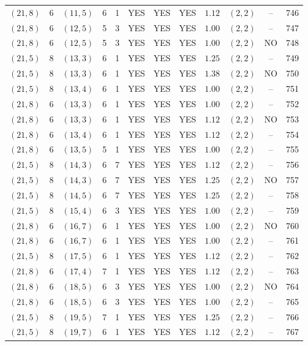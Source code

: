 \begin{longtable}{|c|c|c|c|c|c|c|c|c|c|c|c|}
$(21,8)$ & 6 & $(11,5)$ & 6 & 1 & YES & YES & YES & $1.12$ & $(2,2)$ & -- & 746\\
$(21,8)$ & 6 & $(12,5)$ & 5 & 3 & YES & YES & YES & $1.00$ & $(2,2)$ & -- & 747\\
$(21,8)$ & 6 & $(12,5)$ & 5 & 3 & YES & YES & YES & $1.00$ & $(2,2)$ & NO & 748\\
$(21,5)$ & 8 & $(13,3)$ & 6 & 1 & YES & YES & YES & $1.25$ & $(2,2)$ & -- & 749\\
$(21,5)$ & 8 & $(13,3)$ & 6 & 1 & YES & YES & YES & $1.38$ & $(2,2)$ & NO & 750\\
$(21,5)$ & 8 & $(13,4)$ & 6 & 1 & YES & YES & YES & $1.00$ & $(2,2)$ & -- & 751\\
$(21,8)$ & 6 & $(13,3)$ & 6 & 1 & YES & YES & YES & $1.00$ & $(2,2)$ & -- & 752\\
$(21,8)$ & 6 & $(13,3)$ & 6 & 1 & YES & YES & YES & $1.12$ & $(2,2)$ & NO & 753\\
$(21,8)$ & 6 & $(13,4)$ & 6 & 1 & YES & YES & YES & $1.12$ & $(2,2)$ & -- & 754\\
$(21,8)$ & 6 & $(13,5)$ & 5 & 1 & YES & YES & YES & $1.00$ & $(2,2)$ & -- & 755\\
$(21,5)$ & 8 & $(14,3)$ & 6 & 7 & YES & YES & YES & $1.12$ & $(2,2)$ & -- & 756\\
$(21,5)$ & 8 & $(14,3)$ & 6 & 7 & YES & YES & YES & $1.25$ & $(2,2)$ & NO & 757\\
$(21,5)$ & 8 & $(14,5)$ & 6 & 7 & YES & YES & YES & $1.25$ & $(2,2)$ & -- & 758\\
$(21,5)$ & 8 & $(15,4)$ & 6 & 3 & YES & YES & YES & $1.00$ & $(2,2)$ & -- & 759\\
$(21,8)$ & 6 & $(16,7)$ & 6 & 1 & YES & YES & YES & $1.00$ & $(2,2)$ & NO & 760\\
$(21,8)$ & 6 & $(16,7)$ & 6 & 1 & YES & YES & YES & $1.00$ & $(2,2)$ & -- & 761\\
$(21,5)$ & 8 & $(17,5)$ & 6 & 1 & YES & YES & YES & $1.12$ & $(2,2)$ & -- & 762\\
$(21,8)$ & 6 & $(17,4)$ & 7 & 1 & YES & YES & YES & $1.12$ & $(2,2)$ & -- & 763\\
$(21,8)$ & 6 & $(18,5)$ & 6 & 3 & YES & YES & YES & $1.00$ & $(2,2)$ & NO & 764\\
$(21,8)$ & 6 & $(18,5)$ & 6 & 3 & YES & YES & YES & $1.00$ & $(2,2)$ & -- & 765\\
$(21,5)$ & 8 & $(19,5)$ & 7 & 1 & YES & YES & YES & $1.25$ & $(2,2)$ & -- & 766\\
$(21,5)$ & 8 & $(19,7)$ & 6 & 1 & YES & YES & YES & $1.12$ & $(2,2)$ & -- & 767\\

\end{longtable}
